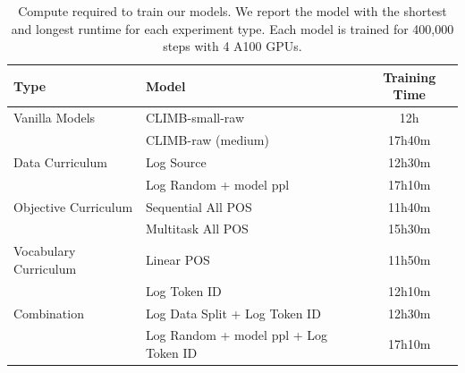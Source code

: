 \begin{table}
    \centering
    \small
    \begin{tabular}{llc}
    \toprule
         Type & Model & Training Time \\
    \midrule
         Vanilla Models & CLIMB-small-raw & 12h \\
         & CLIMB-raw (medium) & 17h40m \\
    \midrule
         Data Curriculum & Log Source & 12h30m \\
         & Log Random + model ppl & 17h10m \\
         Objective Curriculum & Sequential All POS & 11h40m \\
         & Multitask All POS & 15h30m \\
         Vocabulary Curriculum & Linear POS & 11h50m \\
         & Log Token ID & 12h10m \\
    \midrule
        Combination & Log Data Split + Log Token ID & 12h30m \\
        & Log Random + model ppl + Log Token ID & 17h10m \\
    \bottomrule
    \end{tabular}
    \caption{Compute required to train our models. We report the model with the shortest and longest runtime for each experiment type. Each model is trained for 400,000 steps with 4 A100 GPUs.}
    \label{tbl:compute}
\end{table}

